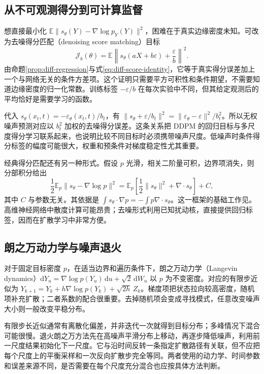 \documentclass[UTF8,12pt,a4paper,fontset=fandol]{ctexart}
\begin{document}
\subsection{从不可观测得分到可计算监督}
想直接最小化 $\mathbb E\|s_\theta(Y)-\nabla\log p_Y(Y)\|^2$，困难在于真实边缘密度未知。可改为去噪得分匹配（denoising score matching）目标
\begin{equation}
 \mathcal J_b(\theta)=\mathbb E\left\|s_\theta(aX+b\varepsilon)+\frac{\varepsilon}{b}\right\|^2.
 \label{eq:diff-dsm}
\end{equation}
由命题\ref{prop:diff-regression}与式\eqref{eq:diff-score-identity}，它等于真实得分误差加上一个与网络无关的条件方差项。这个证明只需要平方可积性和条件期望，不需要知道边缘密度的归一化常数。训练标签 $-\varepsilon/b$ 在每次实验中不同，但其给定观测后的平均恰好是需要学习的函数。

代入 $s_\theta(x_t,t)=-\varepsilon_\theta(x_t,t)/b_t$，有 $\|s_\theta+\varepsilon/b_t\|^2=\|\varepsilon_\theta-\varepsilon\|^2/b_t^2$。所以无权噪声预测对应以 $b_t^2$ 加权的去噪得分误差。这条关系把 DDPM 的回归目标与多尺度得分学习联系起来，也说明比较不同目标时必须携带噪声尺度。低噪声时条件得分标签的幅度可能很大，权重和预条件对梯度稳定性尤其重要。

经典得分匹配还有另一种形式。假设 $p$ 光滑，相关二阶量可积，边界项消失，则分部积分给出
\[
 \frac12\mathbb E_p\|s_\theta-\nabla\log p\|^2
 =\mathbb E_p\left[\frac12\|s_\theta\|^2+\nabla\cdot s_\theta\right]+C,
\]
其中 $C$ 与参数无关。其依据是 $\int s_\theta\cdot\nabla p=-\int p\nabla\cdot s_\theta$。这一框架的基础工作见\cite{hyvarinen2005}。高维神经网络中散度计算可能昂贵；去噪形式利用已知扰动核，直接提供回归标签，因而在扩散学习中非常方便。

\subsection{朗之万动力学与噪声退火}
对于固定目标密度 $p$，在适当边界和遍历条件下，朗之万动力学（Langevin dynamics）$\mathrm dY_u=\nabla\log p(Y_u)\,\mathrm du+\sqrt2\,\mathrm dW_u$ 以 $p$ 为不变密度。对应的有限步近似为 $Y_{k+1}=Y_k+h\nabla\log p(Y_k)+\sqrt{2h}\,Z_k$。梯度项把状态拉向较高密度，随机项补充扩散；二者系数的配合很重要。去掉随机项会变成寻找模式，任意改变噪声大小则一般改变平稳分布。

有限步长近似通常有离散化偏差，并非迭代一次就得到目标分布；多峰情况下混合可能很慢。退火朗之万方法先在高噪声平滑分布上移动，再逐步降低噪声，利用前一尺度结果初始化下一尺度。它与沿时间反转一条指定扩散路径有关联，但不应把每个尺度上的平衡采样和一次反向扩散步完全等同。两者使用的动力学、时间参数和误差来源不同，是否需要在每个尺度充分混合也应按具体方法判断。
\end{document}
